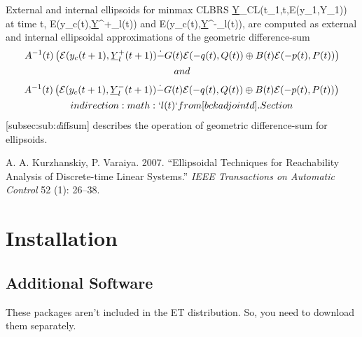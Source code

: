 \documentclass[letterpaper,10pt,english]{sphinxmanual}
\begin{document}
External and internal ellipsoids for minmax CLBRS
\underline{{\mathcal Y}}_{CL}(t_1,t,{\mathcal E}(y_1,Y_1)) at
time t, {\mathcal E}(y_c(t),\underline{Y}^+_l(t)) and
{\mathcal E}(y_c(t),\underline{Y}^-_l(t)), are computed as
external and internal ellipsoidal approximations of the geometric
difference-sum
\begin{gather}
\begin{split}  A^{-1}(t)\left(
  {\mathcal E}(y_c(t+1),\underline{Y}^+_l(t+1))
  \dot{-}G(t){\mathcal E}(-q(t),Q(t))
  \oplus B(t){\mathcal E}(-p(t),P(t))
  \right)\end{split}\notag\\\begin{split}and\end{split}\notag
\end{gather}\begin{gather}
\begin{split}  A^{-1}(t)\left(
  {\mathcal E}(y_c(t+1),\underline{Y}^-_l(t+1))
  \dot{-}G(t){\mathcal E}(-q(t),Q(t))
  \oplus B(t){\mathcal E}(-p(t),P(t))
  \right)\end{split}\notag\\\begin{split}in direction :math:`l(t)` from [bckadjointd]. Section\end{split}\notag
\end{gather}
{[}subsec:sub:\emph{d}iffsum{]} describes the operation of geometric
difference-sum for ellipsoids.

A. A. Kurzhanskiy, P. Varaiya. 2007. “Ellipsoidal Techniques for
Reachability Analysis of Discrete-time Linear Systems.” \emph{IEEE
Transactions on Automatic Control} 52 (1): 26–38.


\chapter{Installation}
\label{chap_install:installation}\label{chap_install::doc}

\section{Additional Software}
\label{chap_install:additional-software}
These packages aren’t included in the ET distribution. So, you need to
download them separately.
\end{document}
